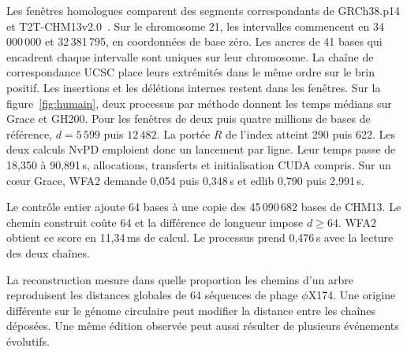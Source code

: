 Les fenêtres homologues comparent des segments correspondants de GRCh38.p14 et T2T-CHM13v2.0~\cite{t2t,chmreleases}. Sur le chromosome 21, les intervalles commencent en 34\,000\,000 et 32\,381\,795, en coordonnées de base zéro. Les ancres de 41 bases qui encadrent chaque intervalle sont uniques sur leur chromosome. La chaîne de correspondance UCSC place leurs extrémités dans le même ordre sur le brin positif. Les insertions et les délétions internes restent dans les fenêtres.
Sur la figure~\ref{fig:humain}, deux processus par méthode donnent les temps médians sur Grace et GH200. Pour les fenêtres de deux puis quatre millions de bases de référence, \(d=5\,599\) puis \(12\,482\). La portée \(R\) de l'index atteint 290 puis 622. Les deux calculs NvPD emploient donc un lancement par ligne. Leur temps passe de 18,350 à 90,891\,s, allocations, transferts et initialisation CUDA compris. Sur un cœur Grace, WFA2 demande 0,054 puis 0,348\,s et edlib 0,790 puis 2,991\,s.

Le contrôle entier ajoute 64 bases à une copie des 45\,090\,682 bases de CHM13. Le chemin construit coûte 64 et la différence de longueur impose \(d\ge64\). WFA2 obtient ce score en 11,34\,ms de calcul. Le processus prend 0,476\,s avec la lecture des deux chaînes.



La reconstruction mesure dans quelle proportion les chemins d'un arbre reproduisent les distances globales de 64 séquences de phage \(\phi\)X174. Une origine différente sur le génome circulaire peut modifier la distance entre les chaînes déposées. Une même édition observée peut aussi résulter de plusieurs événements évolutifs.

